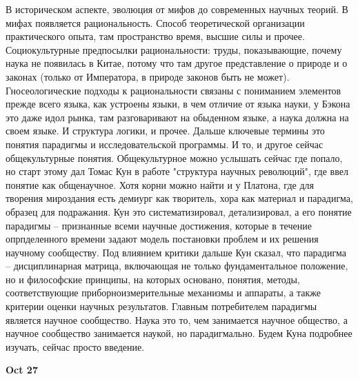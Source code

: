 \documentclass[a4paper, 12pt]{article}
\def\-{\babelhyphen{hard}}
\begin{document}
В историческом аспекте, эволюция от мифов до современных научных теорий. 
В мифах появляется рациональность. Способ теоретической организации 
практического опыта, там пространство время, высшие силы и прочее. 
Социокультурные предпосылки рациональности: труды, показывающие, почему 
наука не появилась в Китае, потому что там другое представление 
о природе и о законах (только от Императора, в природе законов быть не 
может). Гносеологические подходы к рациональности связаны с пониманием 
элементов прежде всего языка, как устроены языки, в чем отличие от языка 
науки, у Бэкона это даже идол рынка, там разговаривают на обыденном 
языке, а наука должна на своем языке. И структура логики, и прочее. 
Дальше ключевые термины это понятия парадигмы и исследовательской 
программы. И то, и другое сейчас общекультурные понятия. Общекультурное 
можно услышать сейчас где попало, но старт этому дал Томас Кун в работе 
"структура научных революций", где ввел понятие как общенаучное. Хотя 
корни можно найти и у Платона, где для творения мироздания есть демиург 
как творитель, хора как материал и парадигма, образец для подражания. 
Кун это систематизировал, детализировал, а его понятие парадигмы -- 
признанные всеми научные достижения, которые в течение опрпделенного 
времени задают модель постановки проблем и их решения научному 
сообществу. Под влиянием критики дальше Кун сказал, что парадигма -- 
дисциплинарная матрица, включающая не только фундаментальное положение, 
но и философские принципы, на которых основано, понятия, методы, 
соответствующие приборно\-измерительные механизмы и аппараты, а также 
критерии оценки научных результатов. Главным потребителем парадигмы 
является научное сообщество. Наука это то, чем занимается научное 
общество, а научное сообщество занимается наукой, но парадигмально. 
Будем Куна подробнее изучать, сейчас просто введение.

\hfill \textbf{Oct 27}
\end{document}

